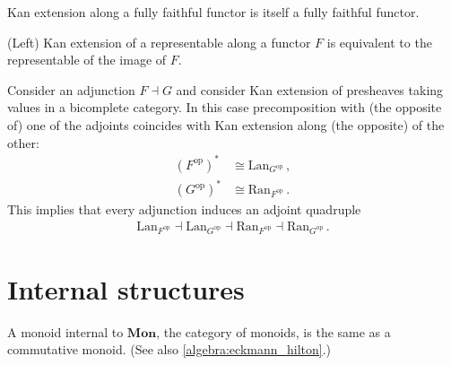     \begin{property}[Faithfulness]
        Kan extension along a fully faithful functor is itself a fully faithful functor.
    \end{property}
    \begin{property}[Representability]
        (Left) Kan extension of a representable along a functor $F$ is equivalent to the representable of the image of $F$.
    \end{property}

    \begin{property}\label{cat:kan_quadruple}
        Consider an adjunction $F\dashv G$ and consider Kan extension of presheaves taking values in a bicomplete category. In this case precomposition with (the opposite of) one of the adjoints coincides with Kan extension along (the opposite) of the other:
        \begin{align}
            (F^{\text{op}})^* &\cong \mathrm{Lan}_{G^{\text{op}}}\,,\\
            (G^{\text{op}})^* &\cong \mathrm{Ran}_{F^{\text{op}}}\,.
        \end{align}
        This implies that every adjunction induces an adjoint quadruple
        \begin{gather}
            \mathrm{Lan}_{F^{\text{op}}}\dashv\mathrm{Lan}_{G^{\text{op}}}\dashv\mathrm{Ran}_{F^{\text{op}}}\dashv\mathrm{Ran}_{G^{\text{op}}}\,.
        \end{gather}
    \end{property}

\section{Internal structures}\label{section:internal_category_theory}

    \begin{property}\label{cat:eckmann_hilton}
        A monoid internal to $\mathbf{Mon}$, the category of monoids, is the same as a commutative monoid. (See also \cref{algebra:eckmann_hilton}.)
    \end{property}

